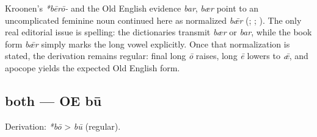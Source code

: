 \documentclass[
  british,
  a4paper,
]{article}
\begin{document}
Kroonen's \emph{*bērō-} and the Old English evidence \emph{bar},
\emph{bær} point to an uncomplicated feminine noun continued here as
normalized \emph{bǣr} (;
;
). The
only real editorial issue is spelling: the dictionaries transmit
\emph{bær} or \emph{bar}, while the book form \emph{bǣr} simply marks
the long vowel explicitly. Once that normalization is stated, the
derivation remains regular: final long \emph{ō} raises, long \emph{ē}
lowers to \emph{ǣ}, and apocope yields the expected Old English form.

\subsection{both --- OE bū}\label{both-oe-bux16b}

Derivation: \emph{*bō} \textgreater{} \emph{bū} (regular).

\begingroup
\setlength{\fboxsep}{6pt}

\noindent{} \endgroup
\end{document}
